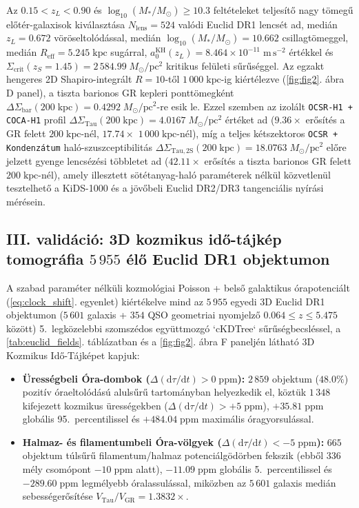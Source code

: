 \documentclass[11pt,a4paper]{article}
\begin{document}
Az $0.15 < z_L < 0.90$ és $\log_{10}(M_*/M_\odot) \ge 10.3$ feltételeket teljesítő nagy tömegű előtér-galaxisok kiválasztása $N_{\mathrm{lens}} = 524$ valódi Euclid DR1 lencsét ad, medián $z_L = 0.672$ vöröseltolódással, medián $\log_{10}(M_*/M_\odot) = 10.662$ csillagtömeggel, medián $R_{\mathrm{eff}} = 5.245\;\mathrm{kpc}$ sugárral, $a_0^{\mathrm{KH}}(z_L) = 8.464\times 10^{-11}\;\mathrm{m\,s^{-2}}$ értékkel és $\Sigma_{\mathrm{crit}}(z_S=1.45) = 2\,584.99\;M_\odot/\mathrm{pc}^2$ kritikus felületi sűrűséggel. Az egzakt hengeres 2D Shapiro-integrált $R = 10$-től $1\,000\;\mathrm{kpc}$-ig kiértélezve (\ref{fig:fig2}. ábra D panel), a tiszta barionos GR kepleri ponttömegként $\Delta\Sigma_{\mathrm{bar}}(200\;\mathrm{kpc}) = 0.4292\;M_\odot/\mathrm{pc}^2$-re esik le. Ezzel szemben az izolált \texttt{OCSR-H1 + COCA-H1} profil $\Delta\Sigma_{\mathrm{Tau}}(200\;\mathrm{kpc}) = 4.0167\;M_\odot/\mathrm{pc}^2$ értéket ad ($9.36\times$ erősítés a GR felett $200\;\mathrm{kpc}$-nél, $17.74\times$ $1\,000\;\mathrm{kpc}$-nél), míg a teljes kétszektoros \texttt{OCSR + Kondenzátum} haló-szuszceptibilitás $\Delta\Sigma_{\mathrm{Tau,2S}}(200\;\mathrm{kpc}) = 18.0763\;M_\odot/\mathrm{pc}^2$ előre jelzett gyenge lencsézési többletet ad ($42.11\times$ erősítés a tiszta barionos GR felett $200\;\mathrm{kpc}$-nél), amely illesztett sötétanyag-haló paraméterek nélkül közvetlenül tesztelhető a KiDS-1000 \cite{Brouwer2021KiDSWL} és a jövőbeli Euclid DR2/DR3 tangenciális nyírási mérésein.

\subsection{III. validáció: 3D kozmikus idő-tájkép tomográfia \texorpdfstring{$5\,955$}{5,955} élő Euclid DR1 objektumon}

A szabad paraméter nélküli kozmológiai Poisson + belső galaktikus órapotenciált (\ref{eq:clock_shift}. egyenlet) kiértékelve mind az $5\,955$ egyedi 3D Euclid DR1 objektumon ($5\,601$ galaxis + $354$ QSO geometriai nyomjelző $0.064 \le z \le 5.475$ között) 5.\ legközelebbi szomszédos együttmozgó `cKDTree` sűrűségbecsléssel, a \ref{tab:euclid_fields}. táblázatban és a \ref{fig:fig2}. ábra F paneljén látható 3D Kozmikus Idő-Tájképet kapjuk:
\begin{itemize}
  \item \textbf{Ürességbeli Óra-dombok ($\Delta(\mathrm{d}\tau/\mathrm{d}t) > 0\;\mathrm{ppm}$):} $2\,859$ objektum ($48.0\%$) pozitív óraeltolódású alulsűrű tartományban helyezkedik el, köztük $1\,348$ kifejezett kozmikus ürességekben ($\Delta(\mathrm{d}\tau/\mathrm{d}t) > +5\;\mathrm{ppm}$), $+35.81\;\mathrm{ppm}$ globális 95.\ percentilissel és $+484.04\;\mathrm{ppm}$ maximális óragyorsulással.
  \item \textbf{Halmaz- és filamentumbeli Óra-völgyek ($\Delta(\mathrm{d}\tau/\mathrm{d}t) < -5\;\mathrm{ppm}$):} $665$ objektum túlsűrű filamentum/halmaz potenciálgödörben fekszik (ebből $336$ mély csomópont $-10\;\mathrm{ppm}$ alatt), $-11.09\;\mathrm{ppm}$ globális 5.\ percentilissel és $-289.60\;\mathrm{ppm}$ legmélyebb óralassulással, miközben az $5\,601$ galaxis medián sebességerősítése $V_{\mathrm{Tau}}/V_{\mathrm{GR}} = 1.3832\times$.
\end{itemize}
\end{document}
